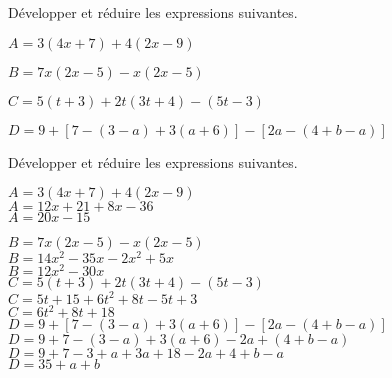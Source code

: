 \begin{exercice*}
    Développer et réduire les expressions suivantes.
    \begin{itemize}
         \begin{spacing}{1.2}
             \item[] $A= 3(4x+7)+4(2x-9)$
             \item[] $B= 7x(2x-5)-x(2x-5)$
             \item[] $C= 5(t+3)+2t(3t+4)-(5t-3)$
             \item[] $D= 9+[7-(3-a)+3(a+6)]-[2a-(4+b-a)]$
         \end{spacing}
    \end{itemize}
\end{exercice*}
\begin{corrige}
    Développer et réduire les expressions suivantes.
    \begin{itemize}
        \def\item{}
         \begin{spacing}{1.2}
            \item $A= 3(4x+7)+4(2x-9)$\\
            {\red $A= 12x+21+8x-36$\\$A= 20x-15$\\}
        \end{spacing}
    \end{itemize}
    \Coupe
    \begin{itemize}
        \def\item{}
         \begin{spacing}{1.2}
            \item $B= 7x(2x-5)-x(2x-5)$\\
            {\red $B= 14x^2-35x-2x^2+5x$\\$B= 12x^2-30x$\\}
            \item $C= 5(t+3)+2t(3t+4)-(5t-3)$\\
            {\red $C= 5t+15+6t^2+8t-5t+3$\\$C=6t^2+8t+18$\\}
            \item $D= 9+[7-(3-a)+3(a+6)]-[2a-(4+b-a)]$\\
            {\red $D= 9+7-(3-a)+3(a+6)-2a+(4+b-a)$\\$D= 9+7-3+a+3a+18-2a+4+b-a$\\$D=35+a+b$}
         \end{spacing}
    \end{itemize}
    \vspace*{-20mm}
\end{corrige}

